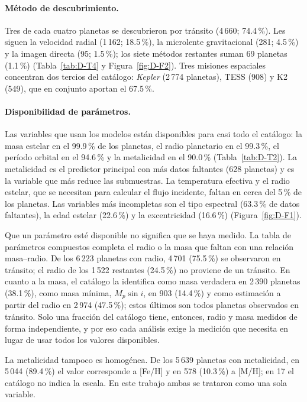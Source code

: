 \paragraph{Método de descubrimiento.}
Tres de cada cuatro planetas se descubrieron por tránsito (4\,660; 74.4\,\%). Les siguen
la velocidad radial (1\,162; 18.5\,\%), la microlente gravitacional (281; 4.5\,\%) y la
imagen directa (95; 1.5\,\%); los siete métodos restantes suman 69 planetas (1.1\,\%)
(Tabla~\ref{tab:D-T4} y Figura~\ref{fig:D-F2}). Tres misiones espaciales concentran dos
tercios del catálogo: \textit{Kepler} (2\,774 planetas), TESS (908) y K2 (549), que en
conjunto aportan el 67.5\,\%.

\paragraph{Disponibilidad de parámetros.}
Las variables que usan los modelos están disponibles para casi todo el catálogo: la masa
estelar en el 99.9\,\% de los planetas, el radio planetario en el 99.3\,\%, el período
orbital en el 94.6\,\% y la metalicidad en el 90.0\,\% (Tabla~\ref{tab:D-T2}). La
metalicidad es el predictor principal con más datos faltantes (628 planetas) y es la
variable que más reduce las submuestras. La temperatura efectiva y el radio estelar, que
se necesitan para calcular el flujo incidente, faltan en cerca del 5\,\% de los planetas.
Las variables más incompletas son el tipo espectral (63.3\,\% de datos faltantes), la edad
estelar (22.6\,\%) y la excentricidad (16.6\,\%) (Figura~\ref{fig:D-F1}).

Que un parámetro esté disponible no significa que se haya medido. La tabla de parámetros
compuestos completa el radio o la masa que faltan con una relación masa--radio. De los
6\,223 planetas con radio, 4\,701 (75.5\,\%) se observaron en tránsito; el radio de los
1\,522 restantes (24.5\,\%) no proviene de un tránsito. En cuanto a la masa, el catálogo la
identifica como masa verdadera en 2\,390 planetas (38.1\,\%), como masa mínima,
$M_p \sin i$, en 903 (14.4\,\%) y como estimación a partir del radio en 2\,974 (47.5\,\%);
estos últimos son todos planetas observados en tránsito. Solo una fracción del catálogo
tiene, entonces, radio y masa medidos de forma independiente, y por eso cada análisis
exige la medición que necesita en lugar de usar todos los valores disponibles.

La metalicidad tampoco es homogénea. De los 5\,639 planetas con metalicidad, en 5\,044
(89.4\,\%) el valor corresponde a [Fe/H] y en 578 (10.3\,\%) a [M/H]; en 17 el catálogo no
indica la escala. En este trabajo ambas se trataron como una sola variable.

